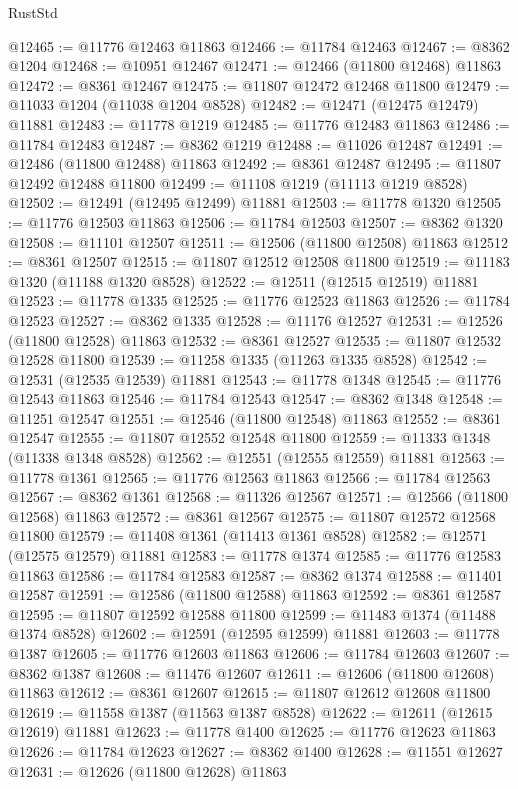 \begin{lexlean}{RustStd}
\begin{coremodule}
@12465 := @11776 @12463 @11863
@12466 := @11784 @12463
@12467 := @8362 @1204
@12468 := @10951 @12467
@12471 := @12466 (@11800 @12468) @11863
@12472 := @8361 @12467
@12475 := @11807 @12472 @12468 @11800
@12479 := @11033 @1204 (@11038 @1204 @8528)
@12482 := @12471 (@12475 @12479) @11881
@12483 := @11778 @1219
@12485 := @11776 @12483 @11863
@12486 := @11784 @12483
@12487 := @8362 @1219
@12488 := @11026 @12487
@12491 := @12486 (@11800 @12488) @11863
@12492 := @8361 @12487
@12495 := @11807 @12492 @12488 @11800
@12499 := @11108 @1219 (@11113 @1219 @8528)
@12502 := @12491 (@12495 @12499) @11881
@12503 := @11778 @1320
@12505 := @11776 @12503 @11863
@12506 := @11784 @12503
@12507 := @8362 @1320
@12508 := @11101 @12507
@12511 := @12506 (@11800 @12508) @11863
@12512 := @8361 @12507
@12515 := @11807 @12512 @12508 @11800
@12519 := @11183 @1320 (@11188 @1320 @8528)
@12522 := @12511 (@12515 @12519) @11881
@12523 := @11778 @1335
@12525 := @11776 @12523 @11863
@12526 := @11784 @12523
@12527 := @8362 @1335
@12528 := @11176 @12527
@12531 := @12526 (@11800 @12528) @11863
@12532 := @8361 @12527
@12535 := @11807 @12532 @12528 @11800
@12539 := @11258 @1335 (@11263 @1335 @8528)
@12542 := @12531 (@12535 @12539) @11881
@12543 := @11778 @1348
@12545 := @11776 @12543 @11863
@12546 := @11784 @12543
@12547 := @8362 @1348
@12548 := @11251 @12547
@12551 := @12546 (@11800 @12548) @11863
@12552 := @8361 @12547
@12555 := @11807 @12552 @12548 @11800
@12559 := @11333 @1348 (@11338 @1348 @8528)
@12562 := @12551 (@12555 @12559) @11881
@12563 := @11778 @1361
@12565 := @11776 @12563 @11863
@12566 := @11784 @12563
@12567 := @8362 @1361
@12568 := @11326 @12567
@12571 := @12566 (@11800 @12568) @11863
@12572 := @8361 @12567
@12575 := @11807 @12572 @12568 @11800
@12579 := @11408 @1361 (@11413 @1361 @8528)
@12582 := @12571 (@12575 @12579) @11881
@12583 := @11778 @1374
@12585 := @11776 @12583 @11863
@12586 := @11784 @12583
@12587 := @8362 @1374
@12588 := @11401 @12587
@12591 := @12586 (@11800 @12588) @11863
@12592 := @8361 @12587
@12595 := @11807 @12592 @12588 @11800
@12599 := @11483 @1374 (@11488 @1374 @8528)
@12602 := @12591 (@12595 @12599) @11881
@12603 := @11778 @1387
@12605 := @11776 @12603 @11863
@12606 := @11784 @12603
@12607 := @8362 @1387
@12608 := @11476 @12607
@12611 := @12606 (@11800 @12608) @11863
@12612 := @8361 @12607
@12615 := @11807 @12612 @12608 @11800
@12619 := @11558 @1387 (@11563 @1387 @8528)
@12622 := @12611 (@12615 @12619) @11881
@12623 := @11778 @1400
@12625 := @11776 @12623 @11863
@12626 := @11784 @12623
@12627 := @8362 @1400
@12628 := @11551 @12627
@12631 := @12626 (@11800 @12628) @11863

\end{coremodule}
\end{lexlean}
